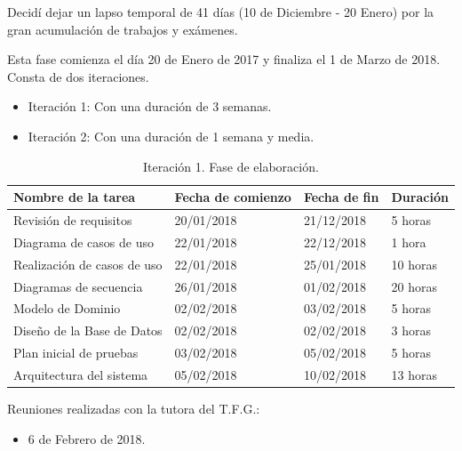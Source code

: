 \documentclass[twoside]{report}
\begin{document}
Decidí dejar un lapso temporal de 41 días (10 de Diciembre - 20 Enero) por la gran acumulación de trabajos y exámenes.

Esta fase comienza el día 20 de Enero de 2017 y finaliza el 1 de Marzo de 2018. Consta de dos iteraciones.

\begin{itemize}
\item Iteración 1: Con una duración de 3 semanas.
\item Iteración 2: Con una duración de 1 semana y media.
\end{itemize}

\begin{table}[H]
\centering
\begin{tabular}{|l|l|l|l|}
\hline
Nombre de la tarea          & Fecha de comienzo & Fecha de fin & Duración \\ \hline
Revisión de requisitos      & 20/01/2018        & 21/12/2018   & 5 horas   \\ \hline
Diagrama de casos de uso    & 22/01/2018        & 22/12/2018   & 1 hora   \\ \hline
Realización de casos de uso & 22/01/2018        & 25/01/2018   & 10 horas  \\ \hline
Diagramas de secuencia      & 26/01/2018        & 01/02/2018   & 20 horas  \\ \hline
Modelo de Dominio 			& 02/02/2018        & 03/02/2018   & 5 horas    \\ \hline
Diseño de la Base de Datos  & 02/02/2018        & 02/02/2018   & 3 horas   \\ \hline
Plan inicial de pruebas     & 03/02/2018        & 05/02/2018   & 5 horas   \\ \hline
Arquitectura del sistema    & 05/02/2018        & 10/02/2018   & 13 horas   \\ \hline
\end{tabular}
\caption{Iteración 1. Fase de elaboración.}
\end{table}

Reuniones realizadas con la tutora del T.F.G.:
\begin{itemize}
\item 6 de Febrero de 2018.
\end{itemize}
\end{document}
